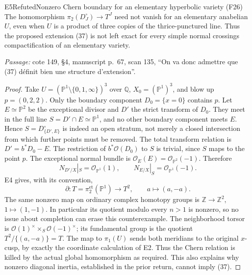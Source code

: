 \begin{result}{E5}{Refuted}{Nonzero Chern boundary for an elementary hyperbolic variety (F26)}
The homomorphism $\pi_2(D_J^\circ)\to T^J$ need not vanish for an elementary anabelian $U$, even when $U$ is a product of three copies of the thrice-punctured line. Thus the proposed extension (37) is not left exact for every simple normal crossings compactification of an elementary variety.
\par\emph{Passage:} cote 149, \S4, manuscript p.~67, scan 135, ``On va donc admettre que (37) d\'efinit bien une structure d'extension''.
\end{result}
\begin{proof}
Take $U=(\mathbb P^1\setminus\{0,1,\infty\})^3$ over $\mathbb Q$, $X_0=(\mathbb P^1)^3$, and blow up $p=(0,2,2)$. Only the boundary component $D_0=\{x=0\}$ contains $p$. Let $E\simeq\mathbb P^2$ be the exceptional divisor and $D'$ the strict transform of $D_0$. They meet in the full line $S=D'\cap E\simeq\mathbb P^1$, and no other boundary component meets $E$. Hence $S=D_{\{D',E\}}^\circ$ is indeed an open stratum, not merely a closed intersection from which further points must be removed.
The total transform relation is $D'=b^*D_0-E$. The restriction of $b^*\mathcal O(D_0)$ to $S$ is trivial, since $S$ maps to the point $p$. The exceptional normal bundle is $\mathcal O_E(E)=\mathcal O_{\mathbb P^2}(-1)$. Therefore
\[
 N_{D'/X}|_S=\mathcal O_{\mathbb P^1}(1),\qquad
 N_{E/X}|_S=\mathcal O_{\mathbb P^1}(-1).
\]
E4 gives, with its convention,
\[
 \partial:T=\pi_2^{\mathrm{et}}(\mathbb P^1)\longrightarrow T^2,
 \qquad a\longmapsto(a,-a).
\]
The same nonzero map on ordinary complex homotopy groups is $\mathbb Z\to\mathbb Z^2$, $1\mapsto(1,-1)$. In particular its quotient modulo every $n>1$ is nonzero, so no issue about completion can erase this counterexample. The neighborhood torsor is $\mathcal O(1)^\times\times_S\mathcal O(-1)^\times$; its fundamental group is the quotient $T^2/\{(a,-a)\}=T$. The map to $\pi_1(U)$ sends both meridians to the original $x$-cusp, by exactly the coordinate calculation of E2. Thus the Chern relation is killed by the actual global homomorphism as required. This also explains why nonzero diagonal inertia, established in the prior return, cannot imply (37).
\end{proof}

